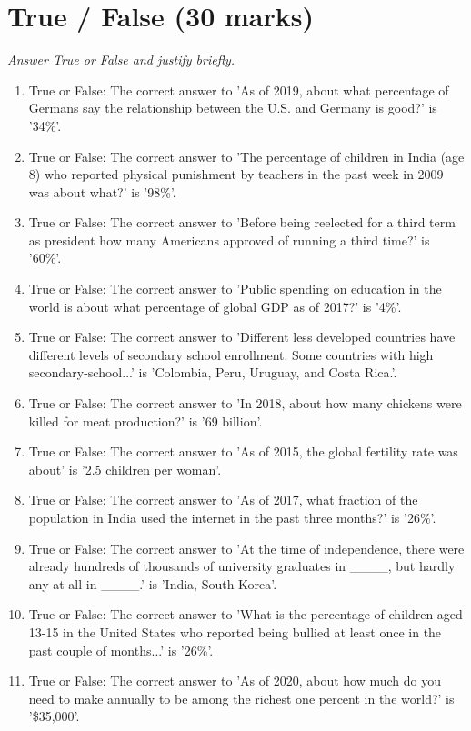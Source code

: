 \documentclass[12pt]{article}
\begin{document}
\section*{True / False (30 marks)}
\textit{Answer True or False and justify briefly.}
\begin{enumerate}[label=\arabic*.]
\item True or False: The correct answer to 'As of 2019, about what percentage of Germans say the relationship between the U.S. and Germany is good?' is '34\%'.
\item True or False: The correct answer to 'The percentage of children in India (age 8) who reported physical punishment by teachers in the past week in 2009 was about what?' is '98\%'.
\item True or False: The correct answer to 'Before being reelected for a third term as president how many Americans approved of running a third time?' is '60\%'.
\item True or False: The correct answer to 'Public spending on education in the world is about what percentage of global GDP as of 2017?' is '4\%'.
\item True or False: The correct answer to 'Different less developed countries have different levels of secondary school enrollment. Some countries with high secondary-school...' is 'Colombia, Peru, Uruguay, and Costa Rica.'.
\item True or False: The correct answer to 'In 2018, about how many chickens were killed for meat production?' is '69 billion'.
\item True or False: The correct answer to 'As of 2015, the global fertility rate was about' is '2.5 children per woman'.
\item True or False: The correct answer to 'As of 2017, what fraction of the population in India used the internet in the past three months?' is '26\%'.
\item True or False: The correct answer to 'At the time of independence, there were already hundreds of thousands of university graduates in \_\_\_\_, but hardly any at all in \_\_\_\_.' is 'India, South Korea'.
\item True or False: The correct answer to 'What is the percentage of children aged 13-15 in the United States who reported being bullied at least once in the past couple of months...' is '26\%'.
\item True or False: The correct answer to 'As of 2020, about how much do you need to make annually to be among the richest one percent in the world?' is '\$35,000'.

\end{enumerate}
\end{document}
